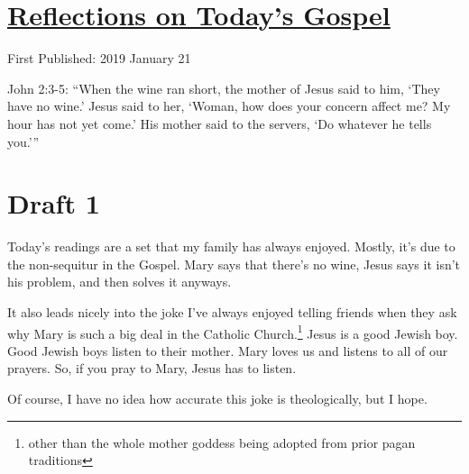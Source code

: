 \documentclass[12pt]{article}[titlepage]
\newcommand{\say}[1]{``#1''}
\newcommand{\nsay}[1]{`#1'}
\newcommand{\1}{\={a}}
\newcommand{\2}{\={e}}
\newcommand{\3}{\={\i}}
\newcommand{\4}{\=o}
\newcommand{\5}{\=u}
\newcommand{\6}{\={A}}
\renewcommand{\,}{\textsuperscript{,}}
\begin{document}
\doublespacing
\section{\href{reflections-on-readings-2-ordinary-c.html}{Reflections on Today's Gospel}}
First Published: 2019 January 21

John 2:3-5: \say{When the wine ran short, the mother of Jesus said to him, \nsay{They have no wine.} Jesus said to her, \nsay{Woman, how does your concern affect me? My hour has not yet come.}
His mother said to the servers, \nsay{Do whatever he tells you.}}

\section{Draft 1}
Today's readings are a set that my family has always enjoyed.
Mostly, it's due to the non-sequitur in the Gospel.
Mary says that there's no wine, Jesus says it isn't his problem, and then solves it anyways.

It also leads nicely into the joke I've always enjoyed telling friends when they ask why Mary is such a big deal in the Catholic Church.\footnote{other than the whole mother goddess being adopted from prior pagan traditions}
Jesus is a good Jewish boy.
Good Jewish boys listen to their mother.
Mary loves us and listens to all of our prayers.
So, if you pray to Mary, Jesus has to listen.

Of course, I have no idea how accurate this joke is theologically, but I hope.
\end{document}
